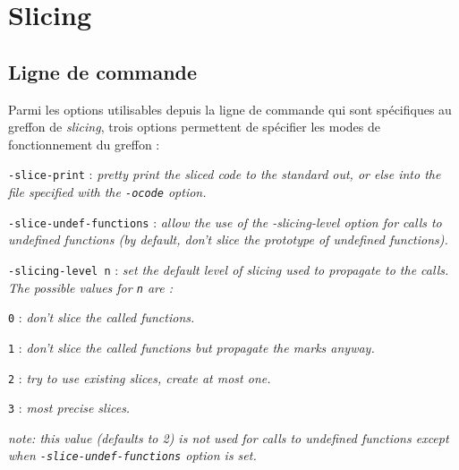 \chapter{Slicing}

\section{Ligne de commande}

Parmi les options utilisables depuis la ligne de commande 
 qui sont spécifiques au greffon de {\sl slicing}, trois options permettent
 de spécifier les modes de fonctionnement du greffon :

\begin{description}
\item {\tt -slice-print} :   
      {\sl pretty print the sliced code to the standard out, or else
        into the file specified with the {\tt -ocode} option.}

\item {\tt -slice-undef-functions} : 
      {\sl allow the use of the -slicing-level option for calls to
        undefined functions (by default, don't slice the prototype of
        undefined functions).}

\item {\tt -slicing-level n} :  
      {\sl set the default level of slicing used to propagate to the calls.}
      {\sl The possible values for {\tt n} are :}
  \begin{description}
  \item {\tt 0} :  
        {\sl don't slice the called functions.}
  \item {\tt 1} :   
        {\sl don't slice the called functions but propagate the marks anyway.}
  \item {\tt 2} :   
        {\sl try to use existing slices, create at most one.}
  \item {\tt 3} :   
        {\sl most precise slices.}
  \end{description}
  {\sl note: this value (defaults to 2) is not used for calls to
    undefined functions except when {\tt-slice-undef-functions} option is set.}


\end{description}

